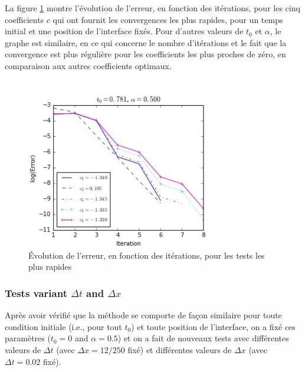 \endgroup

\indent

\indent La figure \ref{fig:errorEvolution} montre l'évolution de l'erreur, en fonction des itérations, pour les cinq coefficients $c$ qui ont fournit les convergences les plus rapides, pour un temps initial et une position de l'interface fixés. Pour d'autres valeurs de $t_0$ et $\alpha$, le graphe est similaire, en ce qui concerne le nombre d'itérations et le fait que la convergence est plus régulière pour les coefficients les plus proches de zéro, en comparaison aux autres coefficients optimaux.

\begin{figure}
\begin{center}
\includegraphics[scale=.5]{figures/FinalFigures/errorEvolutionFixedT0BFinalVersion.png}
\caption{Évolution de l'erreur, en fonction des itérations, pour les tests les plus rapides \label{fig:errorEvolution}}
\end{center}
\end{figure}

\subsubsection{Tests variant $\Delta t$ and $\Delta x$}

\indent Après avoir vérifié que la méthode se comporte de façon similaire pour toute condition initiale (i.e., pour tout $t_0$) et toute position de l'interface, on a fixé ces paramètres ($t_0 = 0$ and $\alpha = 0.5$) et on a fait de nouveaux tests avec différentes valeurs de $\Delta t$ (avec $\Delta x = 12/250$ fixé) et différentes valeurs de $\Delta x$ (avec $\Delta t = 0.02$ fixé).

